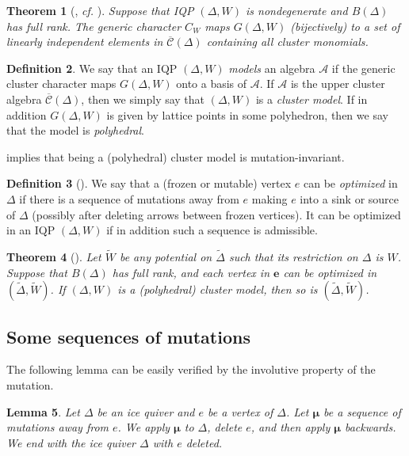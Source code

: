 \documentclass{amsart}
\newtheorem{theorem}{Theorem}[section]
\newtheorem{lemma}[theorem]{Lemma}
\theoremstyle{definition}
\newtheorem{definition}[theorem]{Definition}
\theoremstyle{remark}
\numberwithin{equation}{section}
\newcommand{\mc}[1]{\mathcal{#1}}
\newcommand{\bs}[1]{\boldsymbol{#1}}
\newcommand{\br}[1]{\overline{#1}}
\newcommand{\wtd}[1]{\widetilde{#1}}
\newcommand{\g}{{\sf g}}
\newcommand{\uca}{\br{\mc{C}}}
\begin{document}
\begin{theorem}[{\cite[Corollary 5.14]{Fs1}, {\em cf.} \cite[Theorem 1.1]{P}}] \label{T:GCC} Suppose that IQP $(\Delta,W)$ is nondegenerate and $B(\Delta)$ has full rank.
	The generic character $C_W$ maps $G(\Delta,W)$ (bijectively) to a set of linearly independent elements in $\br{\mc{C}}(\Delta)$ containing all cluster monomials.
\end{theorem}


\begin{definition} \label{D:model}
	We say that an IQP $(\Delta,W)$ {\em models} an algebra $\mc{A}$ if the generic cluster character maps $G(\Delta,W)$ onto a basis of $\mc{A}$.
	If $\mc{A}$ is the upper cluster algebra $\uca(\Delta)$, then we simply say that $(\Delta,W)$ is a {\em cluster model}.
	If in addition $G(\Delta,W)$ is given by lattice points in some polyhedron, then we say that the model is {\em polyhedral}.
\end{definition}

\noindent %
\cite[Proposition 5.15]{Fs1} implies that being a (polyhedral) cluster model is mutation-invariant.

\begin{definition}[\cite{GHKK}]
	We say that a (frozen or mutable) vertex $e$ can be {\em optimized} in $\Delta$ if there is a sequence of mutations away from $e$ making $e$ into a sink or source of $\Delta$ (possibly after deleting arrows between frozen vertices). 
	It can be optimized in an IQP $(\Delta,W)$ if in addition such a sequence is admissible.
\end{definition}

\begin{theorem}[{\cite[Theorem 2.13]{FW}}] \label{T:Cmodel} Let $\wtd{W}$ be any potential on $\wtd{\Delta}$ such that its restriction on $\Delta$ is $W$.
	Suppose that $B(\Delta)$ has full rank, and each vertex in $\bs{e}$ can be optimized in $(\wtd{\Delta},\wtd{W})$.
	If $(\Delta,W)$ is a (polyhedral) cluster model, then so is $(\wtd{\Delta},\wtd{W})$.
\end{theorem}


\subsection{Some sequences of mutations} \label{ss:museq}
The following lemma can be easily verified by the involutive property of the mutation.
\begin{lemma} \label{L:delrecover} Let $\Delta$ be an ice quiver and $e$ be a vertex of $\Delta$. 
Let $\bs{\mu}$ be a sequence of mutations away from $e$.
We apply $\bs{\mu}$ to $\Delta$, delete $e$, and then apply $\bs{\mu}$ backwards.
We end with the ice quiver $\Delta$ with $e$ deleted.
\end{lemma}
\end{document}
